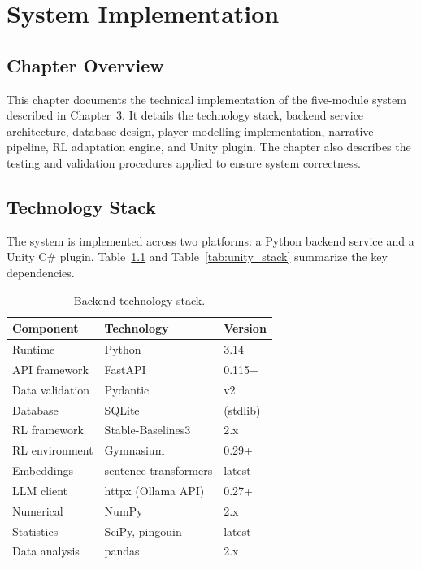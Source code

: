 \documentclass[12pt,a4paper]{report}
\begin{document}
\chapter{System Implementation}

\section{Chapter Overview}

This chapter documents the technical implementation of the five-module system described in Chapter~3. It details the technology stack, backend service architecture, database design, player modelling implementation, narrative pipeline, RL adaptation engine, and Unity plugin. The chapter also describes the testing and validation procedures applied to ensure system correctness.

\section{Technology Stack}

The system is implemented across two platforms: a Python backend service and a Unity C\# plugin. Table~\ref{tab:backend_stack} and Table~\ref{tab:unity_stack} summarize the key dependencies.

\begin{table}[H]
\centering
\caption{Backend technology stack.}
\label{tab:backend_stack}
\small
\begin{tabular}{@{}lll@{}}
\toprule
\textbf{Component} & \textbf{Technology} & \textbf{Version} \\
\midrule
Runtime & Python & 3.14 \\
API framework & FastAPI & 0.115+ \\
Data validation & Pydantic & v2 \\
Database & SQLite & (stdlib) \\
RL framework & Stable-Baselines3 & 2.x \\
RL environment & Gymnasium & 0.29+ \\
Embeddings & sentence-transformers & latest \\
LLM client & httpx (Ollama API) & 0.27+ \\
Numerical & NumPy & 2.x \\
Statistics & SciPy, pingouin & latest \\
Data analysis & pandas & 2.x \\
\bottomrule
\end{tabular}
\end{table}
\end{document}

